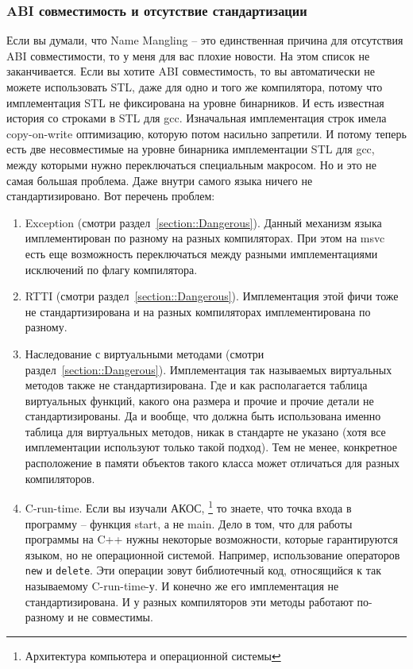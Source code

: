 \subsubsection{ABI совместимость и отсутствие стандартизации}

Если вы думали, что Name Mangling -- это единственная причина для отсутствия ABI совместимости, то у меня для вас плохие новости.
На этом список не заканчивается.
Если вы хотите ABI совместимость, то вы автоматически не можете использовать STL, даже для одно и того же компилятора, потому что имплементация STL не фиксирована на уровне бинарников.
И есть известная история со строками в STL для gcc.
Изначальная имплементация строк имела copy-on-write оптимизацию, которую потом насильно запретили.
И потому теперь есть две несовместимые на уровне бинарника имплементации STL для gcc, между которыми нужно переключаться специальным макросом.
Но и это не самая большая проблема.
Даже внутри самого языка ничего не стандартизировано.
Вот перечень проблем:
\begin{enumerate}
\item Exception (смотри раздел~\ref{section::Dangerous}).
Данный механизм языка имплементирован по разному на разных компиляторах.
При этом на msvc есть еще возможность переключаться между разными имплементациями исключений по флагу компилятора.

\item RTTI (смотри раздел~\ref{section::Dangerous}).
Имплементация этой фичи тоже не стандартизирована и на разных компиляторах имплементирована по разному.

\item Наследование с виртуальными методами (смотри раздел~\ref{section::Dangerous}).
Имплементация так называемых виртуальных методов также не стандартизирована.
Где и как располагается таблица виртуальных функций, какого она размера и прочие и прочие детали не стандартизированы.
Да и вообще, что должна быть использована именно таблица для виртуальных методов, никак в стандарте не указано (хотя все имплементации используют только такой подход).
Тем не менее, конкретное расположение в памяти объектов такого класса может отличаться для разных компиляторов.

\item C-run-time.
Если вы изучали АКОС,%
\footnote{Архитектура компьютера и операционной системы}
то знаете, что точка входа в программу -- функция start, а не main.
Дело в том, что для работы программы на C++ нужны некоторые возможности, которые гарантируются языком, но не операционной системой.
Например, использование операторов \verb"new" и \verb"delete".
Эти операции зовут библиотечный код, относящийся к так называемому C-run-time-у.
И конечно же его имплементация не стандартизирована.
И у разных компиляторов эти методы работают по-разному и не совместимы.
\end{enumerate}
